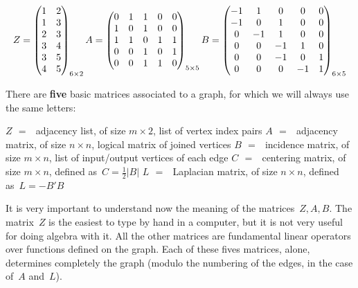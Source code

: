 $$
Z = \begin{pmatrix}
1 & 2 \\
1 & 3 \\
2 & 3 \\
3 & 4 \\
3 & 5 \\
4 & 5
\end{pmatrix}_{\small 6\times 2}
A = \begin{pmatrix}
	0 & 1 & 1 & 0 & 0 \\
	1 & 0 & 1 & 0 & 0 \\
	1 & 1 & 0 & 1 & 1 \\
	0 & 0 & 1 & 0 & 1 \\
	0 & 0 & 1 & 1 & 0 \\
\end{pmatrix}_{\small 5\times 5}
B = \begin{pmatrix}
	-1& 1 & 0 & 0 & 0 \\
	-1& 0 & 1 & 0 & 0 \\
	0 &-1 & 1 & 0 & 0 \\
	0 & 0 &-1 & 1 & 0 \\
	0 & 0 &-1 & 0 & 1 \\
	0 & 0 & 0 &-1 & 1 \\
\end{pmatrix}_{\small 6\times 5}
$$

There are {\bf five} basic matrices associated to a graph, for which we will
always use the same letters:

$Z\ \,=\ \,$ adjacency list, of size $m\times 2$,
             list of vertex index pairs \newline
$A\ \,=\ \,$ adjacency matrix, of size $n\times n$,
             logical matrix of joined vertices \newline
$B\ \,=\ \,$ incidence matrix, of size $m\times n$,
             list of input/output vertices of each edge \newline
$C\ \,=\ \,$ centering matrix, of size $m\times n$,
             defined as~$C=\frac{1}{2}|B|$ \newline
$L\ \,=\ \,$ Laplacian matrix, of size $n\times n$,
             defined as~$L=-B'B$

It is very important to understand now the meaning of the matrices~$Z,A,B$.
The matrix~$Z$ is the easiest to type by hand in a computer, but it is not
very useful for doing algebra with it.  All the other matrices are
fundamental linear operators over functions defined on the graph.  Each of
these fives matrices, alone, determines completely the graph (modulo the
numbering of the edges, in the case of~$A$ and~$L$).

